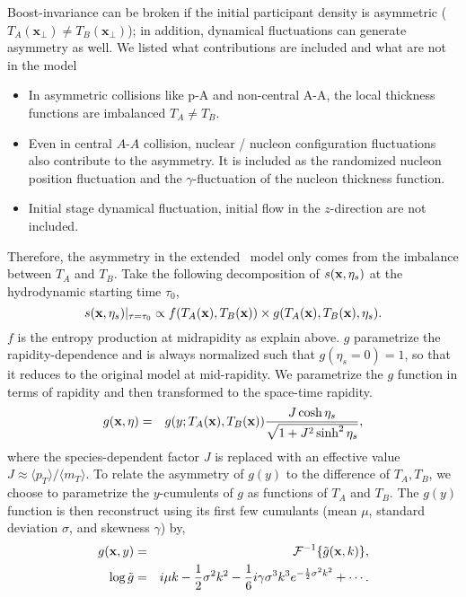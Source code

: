 Boost-invariance can be broken if the initial participant density is asymmetric ($T_A(\mathbf{x}_\perp) \neq T_B(\mathbf{x}_\perp)$); in addition, dynamical fluctuations can generate asymmetry as well.
We listed what contributions are included and what are not in the model
\begin{itemize}
\item In asymmetric collisions like p-A and non-central A-A, the local thickness functions are imbalanced $T_A \neq T_B$.
\item Even in central $A$-$A$ collision, nuclear / nucleon configuration fluctuations also contribute to the asymmetry. It is included as the randomized nucleon position fluctuation and the $\gamma$-fluctuation of the nucleon thickness function.
\item Initial stage dynamical fluctuation, initial flow in the $z$-direction are not included.
\end{itemize}
Therefore, the asymmetry in the extended \trento\ model only comes from the imbalance between $T_A$ and $T_B$.
Take the following decomposition of $s(\mathbf x, \eta_s)$ at the hydrodynamic starting time $\tau_0$,
\begin{equation}
  s(\mathbf x, \eta_s)\vert_{\tau=\tau_0} \propto f(T_A(\mathbf x), T_B(\mathbf x)) \times g(T_A(\mathbf x), T_B(\mathbf x), \eta_s).
  \label{factorized}
\end{equation}
$f$ is the entropy production at midrapidity as explain above.
$g$ parametrize the rapidity-dependence and is always normalized such that $g(\eta_s=0)=1$, so that it reduces to the original model at mid-rapidity.
We parametrize the $g$ function in terms of rapidity and then transformed to the space-time rapidity.
\begin{eqnarray}
g(\mathbf x, \eta) &=& g(y; T_A(\mathbf x), T_B(\mathbf x)) \frac{J \cosh \eta_s}{\sqrt{1 + J^2 \sinh^2 \eta_s}},
\label{jacobian}
\end{eqnarray}
where the species-dependent factor $J$ is replaced with an effective value $J \approx \langle p_T \rangle / \langle m_T \rangle$.
To relate the asymmetry of $g(y)$ to the difference of $T_A, T_B$, we choose to parametrize the $y$-cumulents of $g$ as functions of $T_A$ and $T_B$.
The $g(y)$ function is then reconstruct using its first few cumulants (mean $\mu$, standard deviation $\sigma$, and skewness $\gamma$) by,
\begin{eqnarray}
g(\x, y) &=& \mathcal{F}^{-1}\{\tilde{g}(\x, k)\}, \\
\log \tilde{g} &=&  i \mu k - \frac{1}{2}\sigma^2 k^2 - \frac{1}{6} i \gamma \sigma^3 k^3  e^{-\frac{1}{2}\sigma^2 k^2} + \cdots \label{eq:cgf}.
\end{eqnarray}
